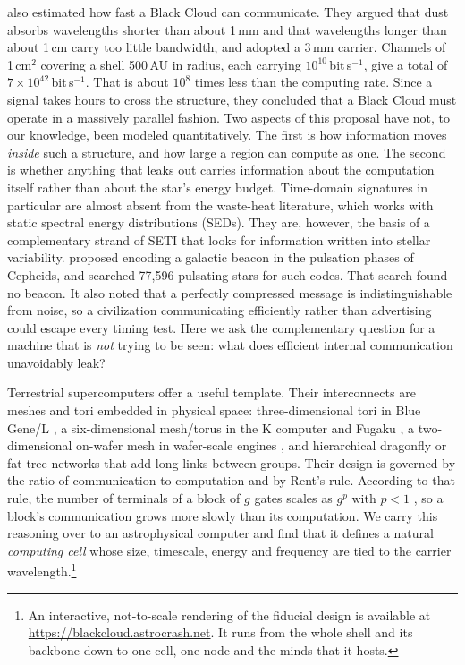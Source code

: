 \documentclass[final,5p]{elsarticle}
\begin{document}
\citet{LaughlinAdams2021} also estimated how fast a Black Cloud can communicate. They argued that dust absorbs wavelengths shorter than about 1\,mm and that wavelengths longer than about 1\,cm carry too little bandwidth, and adopted a 3\,mm carrier. Channels of 1\,cm$^2$ covering a shell 500\,AU in radius, each carrying $10^{10}$\,bit\,s$^{-1}$, give a total of $7\times10^{42}$\,bit\,s$^{-1}$. That is about $10^8$ times less than the computing rate. Since a signal takes hours to cross the structure, they concluded that a Black Cloud must operate in a massively parallel fashion. Two aspects of this proposal have not, to our knowledge, been modeled quantitatively. The first is how information moves \emph{inside} such a structure, and how large a region can compute as one. The second is whether anything that leaks out carries information about the computation itself rather than about the star's energy budget. Time-domain signatures in particular are almost absent from the waste-heat literature, which works with static spectral energy distributions (SEDs). They are, however, the basis of a complementary strand of SETI that looks for information written into stellar variability. \citet{Learned2008} proposed encoding a galactic beacon in the pulsation phases of Cepheids, and \citet{Guillochon2026} searched 77{,}596 pulsating stars for such codes. That search found no beacon. It also noted that a perfectly compressed message is indistinguishable from noise, so a civilization communicating efficiently rather than advertising could escape every timing test. Here we ask the complementary question for a machine that is \emph{not} trying to be seen: what does efficient internal communication unavoidably leak?

Terrestrial supercomputers offer a useful template. Their interconnects are meshes and tori embedded in physical space: three-dimensional tori in Blue Gene/L \citep{Adiga2005}, a six-dimensional mesh/torus in the K computer and Fugaku \citep{Ajima2009,Ajima2018}, a two-dimensional on-wafer mesh in wafer-scale engines \citep{Lie2024}, and hierarchical dragonfly \citep{Kim2008} or fat-tree \citep{Leiserson1985} networks that add long links between groups. Their design is governed by the ratio of communication to computation and by Rent's rule. According to that rule, the number of terminals of a block of $g$ gates scales as $g^{p}$ with $p<1$ \citep{Landman1971,Christie2000}, so a block's communication grows more slowly than its computation. We carry this reasoning over to an astrophysical computer and find that it defines a natural \emph{computing cell} whose size, timescale, energy and frequency are tied to the carrier wavelength.\footnote{An interactive, not-to-scale rendering of the fiducial design is available at \url{https://blackcloud.astrocrash.net}. It runs from the whole shell and its backbone down to one cell, one node and the minds that it hosts.}
\end{document}
